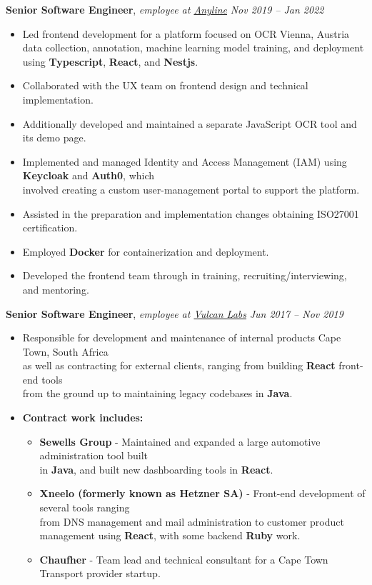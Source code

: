 \documentclass[9pt]{extarticle}
\begin{document}
\noindent
{\bf Senior Software Engineer}, \textit{employee at \href{https://anyline.com}{Anyline}}  \hfill \textit{Nov 2019 -- Jan 2022}
\begin{itemize}
\setlength\itemsep{0.05em}

\item Led frontend development for a platform focused on OCR \hfill Vienna, Austria \\
data collection, annotation, machine learning model training, and deployment using \textbf{Typescript}, \textbf{React}, and \textbf{Nestjs}.
\item Collaborated with the UX team on frontend design and technical implementation.
\item Additionally developed and maintained a separate JavaScript OCR tool and its demo page.
\item Implemented and managed Identity and Access Management (IAM) using \textbf{Keycloak} and \textbf{Auth0}, which \\
involved creating a custom user-management portal to support the platform.
\item Assisted in the preparation and implementation changes obtaining ISO27001 certification.
\item Employed \textbf{Docker} for containerization and deployment.
\item Developed the frontend team through in training, recruiting/interviewing, and mentoring.

\end{itemize}

\noindent
{\bf Senior Software Engineer}, \textit{employee at \href{https://vulcanlabs.com/}{Vulcan Labs}}  \hfill \textit{Jun 2017 -- Nov 2019}
\begin{itemize}
\setlength\itemsep{0.05em}

\item Responsible for development and maintenance of internal products \hfill Cape Town, South Africa \\
as well as contracting for external clients, ranging from building \textbf{React} front-end tools \\
from the ground up to maintaining legacy codebases in \textbf{Java}.
\item \textbf{Contract work includes:}
  \begin{itemize}
    \item \textbf{Sewells Group} - Maintained and expanded a large automotive administration tool built \\
    in \textbf{Java}, and built new dashboarding tools in \textbf{React}.
    \item \textbf{Xneelo (formerly known as Hetzner SA)} - Front-end development of several tools ranging \\
    from DNS management and mail administration to customer product management using \textbf{React}, with some backend \textbf{Ruby} work.
    \item \textbf{Chaufher} - Team lead and technical consultant for a Cape Town Transport provider startup.
  \end{itemize}


\end{itemize}
\end{document}
